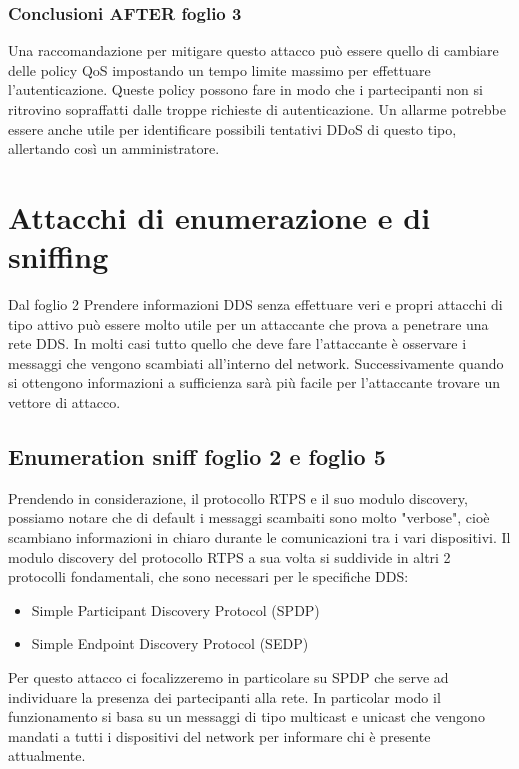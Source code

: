\subsubsection{Conclusioni AFTER foglio 3}
Una raccomandazione per mitigare questo attacco può essere quello di cambiare delle
policy QoS impostando un tempo limite massimo per effettuare
l'autenticazione. Queste policy possono fare in modo
che i partecipanti non si ritrovino sopraffatti dalle troppe richieste di
autenticazione. Un allarme potrebbe essere anche utile per identificare possibili
tentativi DDoS di questo tipo, allertando così un amministratore.
\cite{DBLP:conf/asiaccs/WangLG24}

\section{Attacchi di enumerazione e di sniffing}
Dal foglio 2
Prendere informazioni DDS senza effettuare veri e propri
attacchi di tipo attivo può essere molto utile per un attaccante che prova
a penetrare una rete DDS. In molti casi tutto quello che deve fare l'attaccante
è osservare i messaggi che vengono scambiati all'interno del network.
Successivamente quando si ottengono informazioni a sufficienza sarà più
facile per l'attaccante trovare un vettore di attacco.\cite{White2017AnII}


\subsection{Enumeration sniff foglio 2 e foglio 5}
Prendendo in considerazione, il protocollo RTPS e il suo modulo discovery,
possiamo notare che di default i messaggi scambaiti sono molto "verbose", 
cioè scambiano informazioni in
chiaro durante le comunicazioni tra i vari dispositivi.\cite{White2017AnII} Il modulo 
discovery del protocollo RTPS a sua volta si suddivide in
altri 2 protocolli fondamentali, che sono necessari per le specifiche DDS:
\begin{itemize}
    \item Simple Participant Discovery Protocol (SPDP)
    \item Simple Endpoint Discovery Protocol (SEDP)
\end{itemize}
Per questo attacco ci focalizzeremo in particolare su SPDP che serve ad
individuare la presenza dei partecipanti alla rete. In particolar modo
il funzionamento si basa su un messaggi di tipo multicast e unicast che vengono
mandati a tutti i dispositivi del network per informare chi è presente attualmente.
\cite{ddsrtps}


